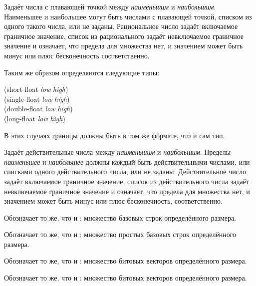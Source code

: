 \begin{flushdesc}
\item[\cd{(float \emph{наименьшее} \emph{наибольшее})}]
  Задаёт числа с плавающей точкой  между \emph{наименьшим} и
  \emph{наибольшим}. Наименьшее и наибольшее могут быть числами с плавающей точкой, списком
  из одного такого числа, или не заданы.
  Рациональное число задаёт включаемое граничное значение, список из
  рационального задаёт невключаемое граничное значение и \cdf{*} означает, что
  предела для множества нет, и значением может быть минус или плюс бесконечность
  соответственно.

  Таким же образом определяются следующие типы:
  \begin{lisp}
    (short-float \emph{low} \emph{high}) \\
    (single-float \emph{low} \emph{high}) \\
    (double-float \emph{low} \emph{high}) \\
    (long-float \emph{low} \emph{high})
  \end{lisp}
  В этих случаях границы должны быть в том же формате, что и сам тип.
\end{flushdesc}

\begin{flushdesc}
\item[\cd{(real \emph{наименьшее} \emph{наибольшее})}]
  Задаёт действительные числа между \emph{наименьшим} и \emph{наибольшим}. Пределы
  \emph{наименьшее} и \emph{наибольшее} должны каждый быть действительными числами, или
  списками одного действительного числа, или не заданы.
  Действительное число задаёт включаемое граничное значение, список из
  действительного числа задаёт невключаемое граничное значение и \cdf{*} означает,
  что предела для множества нет, и значением может быть минус или плюс
  бесконечность, соответственно.
\end{flushdesc}

\begin{flushdesc}
\item[\cd{(base-string \emph{размер})}]
  Обозначает то же, что и : множество
  базовых строк определённого размера.

\item[\cd{(simple-base-string \emph{размер})}]
  Обозначает то же, что и : множество
  простых базовых строк определённого размера.
\end{flushdesc}


\begin{flushdesc}
\item[\cd{(bit-vector \emph{размер})}]
  Обозначает то же, что и : множество битовых
  векторов определённого размера.

\item[\cd{(simple-bit-vector \emph{размер})}]
  Обозначает то же, что и : множество битовых
  векторов определённого размера.
\end{flushdesc}

